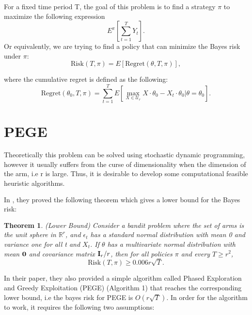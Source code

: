 \documentclass{article}
\newtheorem{theorem}{Theorem}
\theoremstyle{plain}
\theoremstyle{definition}
\begin{document}
For a fixed time period T, the goal of this problem is to find a strategy $\pi$ to maximize the following expression
\begin{equation}
E^{\pi}\left[\sum_{t=1}^{T} Y_{t}\right].
\end{equation}
Or equivalently, we are trying to find a policy that can minimize the Bayes risk under $\pi$:
\begin{equation}
\text{Risk}(T,\pi) = E\left[\text{Regret}(\theta,T,\pi)\right],
\end{equation}

where the cumulative regret is defined as the following:
\begin{equation}
\text{Regret}(\theta_{0},T,\pi)=\sum_{t=1}^{T}E\left[\max_{X\in \mathcal{U}_{r}}X\cdot\theta_{0}-X_{t}\cdot \theta_{0}|\theta=\theta_{0}\right].
\end{equation}





\section{PEGE}

Theoretically this problem can be solved using stochastic dynamic programming, however it usually suffers from the curse of dimensionality when the dimension of the arm, i.e r is large. Thus, it is desirable to develop some computational feasible heuristic algorithms.

In \cite{Paat}, they proved the following theorem which gives a lower bound for the Bayes risk:

\begin{theorem}(Lower Bound)
Consider a bandit problem where the set of arms is the unit sphere in $\mathbb{R}^{r}$, and $\epsilon_{t}$ has a standard normal distribution with mean 0 and variance one for all t and $X_{t}$. If $\theta$ has a multivariate normal distribution with mean $\bold{0}$ and covariance matrix $\bold{I}_{r}/r$, then for all policies $\pi$ and every $T\geq r^{2}$,
\begin{equation}
\text{Risk}(T,\pi)\geq 0.006r\sqrt{T}. \nonumber 
\end{equation}
\end{theorem}

In their paper, they also provided a simple algorithm called Phased Exploration and Greedy Exploitation (PEGE) (Algorithm 1) that reaches the corresponding lower bound, i.e the bayes risk for PEGE is $O(r\sqrt{T})$. In order for the algorithm to work, it requires the following two assumptions:
\end{document}
